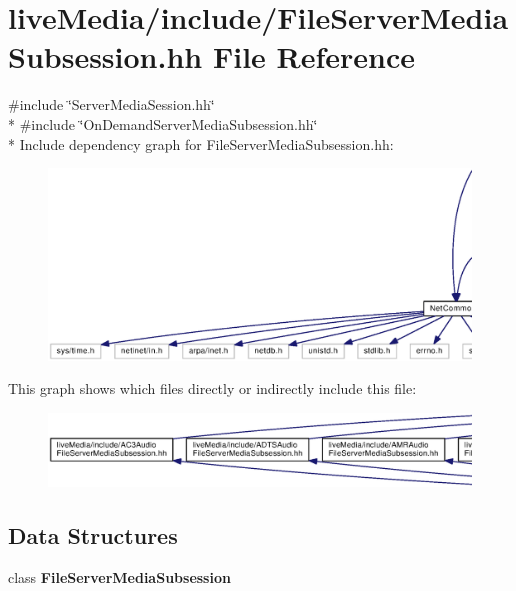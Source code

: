 \section{live\+Media/include/\+File\+Server\+Media\+Subsession.hh File Reference}
\label{FileServerMediaSubsession_8hh}
{\ttfamily \#include \char`\"{}Server\+Media\+Session.\+hh\char`\"{}}\\*
{\ttfamily \#include \char`\"{}On\+Demand\+Server\+Media\+Subsession.\+hh\char`\"{}}\\*
Include dependency graph for File\+Server\+Media\+Subsession.\+hh\+:
\nopagebreak
\begin{figure}[H]
\begin{center}
\leavevmode
\includegraphics[width=350pt]{FileServerMediaSubsession_8hh__incl}
\end{center}
\end{figure}
This graph shows which files directly or indirectly include this file\+:
\nopagebreak
\begin{figure}[H]
\begin{center}
\leavevmode
\includegraphics[width=350pt]{FileServerMediaSubsession_8hh__dep__incl}
\end{center}
\end{figure}
\subsection*{Data Structures}
\begin{DoxyCompactItemize}
\item 
class {\bf File\+Server\+Media\+Subsession}
\end{DoxyCompactItemize}
